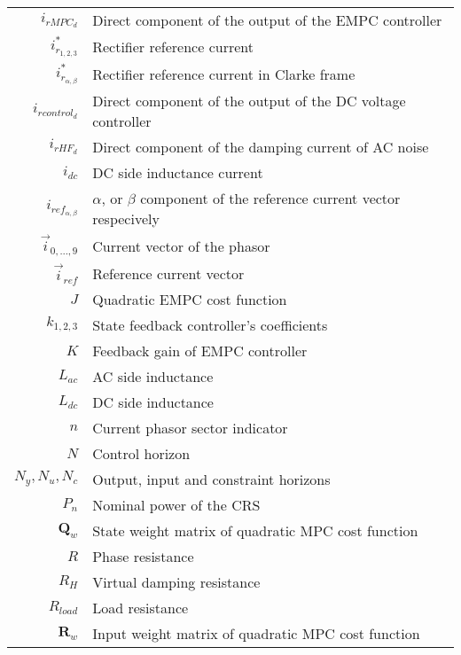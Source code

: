\begin{longtable}{r l}
  $i_{rMPC_d}$                      & Direct component of the output of the EMPC controller\\
  $i^*_{r_{1,2,3}}$                 & Rectifier reference current\\
  $i^*_{r_{\alpha,\beta}}$          & Rectifier reference current in Clarke frame\\
  $i_{rcontrol_d}$                  & Direct component of the output of the DC voltage controller\\
  $i_{rHF_d}$                       & Direct component of the damping current of AC noise\\
  $i_{dc}$                          & DC side inductance current\\
  $i_{ref_{\alpha,\beta}}$          & $\alpha$, or $\beta$ component of the reference current vector respecively\\
  $\vec{i}_{0,\dots,9}$             & Current vector of the phasor\\
  $\vec{i}_{ref}$                   & Reference current vector\\
  $J$                               & Quadratic EMPC cost function\\
  $k_{1,2,3}$                       & State feedback controller's coefficients\\
  $K$                               & Feedback gain of EMPC controller\\
  $L_{ac}$                          & AC side inductance\\
  $L_{dc}$                          & DC side inductance\\
  $n$                               & Current phasor sector indicator\\
  $N$                               & Control horizon\\
  $N_y,N_u,N_c$                     & Output, input and constraint horizons\\
  $P_n$                             & Nominal power of the CRS\\
  $\boldsymbol{Q}_w$                & State weight matrix of quadratic MPC cost function\\
  $R$                               & Phase resistance\\
  $R_H$                             & Virtual damping resistance\\
  $R_{load}$                        & Load resistance\\
  $\boldsymbol{R}_w$                & Input weight matrix of quadratic MPC cost function\\

\end{longtable}

